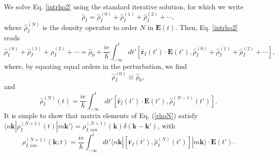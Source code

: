 
We solve Eq. \eqref{intrho2} using the standard iterative
solution, for which we write
\begin{equation}\label{rhop}
\hat{\rho}_{I} = \hat{\rho}_{I}^{(0)} + \hat{\rho}_{I}^{(1)} + \hat{\rho}_{I}^{(2)} + \cdots
,
\end{equation}
where $\hat{\rho}_{I}^{(N)}$ is the density operator to order $N$ in $\mathbf{E}(t)$.
Then, Eq. \eqref{intrho2} reads
\begin{equation}\label{intrho3}
\hat{\rho}_{I}^{(0)} + \hat{\rho}_{I}^{(1)} + \hat{\rho}_{I}^{(2)} + \cdots
= \hat{\rho}_{0}
+
\frac{ie}{\hbar}\int_{-\infty}^t dt'[\hat{\mathbf{r}}_{I}(t')\cdot\mathbf{E}(t'),
\hat{\rho}_{I}^{(0)}+\hat{\rho}_{I}^{(1)}+\hat{\rho}_{I}^{(2)}+\cdots
]
,
\end{equation}
where, by equating equal orders in the perturbation, we find
\begin{equation}\label{rho0}
\hat{\rho}_{I}^{(0)}\equiv\hat{\rho}_{0}
,
\end{equation}
and
\begin{equation}\label{rhoN}
\hat{\rho}_{I}^{(N)}(t)=
\frac{ie}{\hbar}
\int_{-\infty}^t dt'[\hat{\mathbf{r}}_{I}(t')\cdot\mathbf{E}(t'),\hat{\rho}^{(N-1)}_{I}(t')].
\end{equation}
It is simple to show that matrix elements of Eq. (\ref{rhoN}) satisfy
$\langle n\mathbf{k}| \rho_{I}^{(N+1)}(t) |m\mathbf{k}'\rangle = \rho^{(N+1)}_{I,nm}(\mathbf{k})\delta(\mathbf{k}-\mathbf{k}')$,
with
\begin{equation}\label{rtilde}
\rho^{(N+1)}_{I,nm}(\mathbf{k};t)
=\frac{ie}{\hbar}\int_{-\infty}^t dt'
\langle n\mathbf{k}|
[\hat{\mathbf{r}}_{I}(t'),\hat{\rho}^{(N)}_{I}(t')]
|m\mathbf{k}\rangle
\cdot\mathbf{E}(t')
.
\end{equation}

